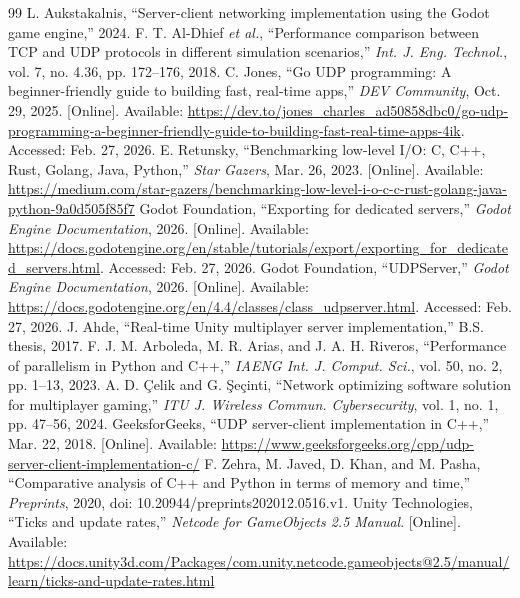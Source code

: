 \IfFileExists{IEEEtran.cls}{\ieeetrue\documentclass[conference]{IEEEtran}}{\ieeefalse\documentclass[twocolumn,10pt]{article}}
\begin{document}
\begin{thebibliography}{99}
 L. Aukstakalnis, ``Server-client networking implementation using the Godot game engine,'' 2024.
 F. T. Al-Dhief \emph{et al.}, ``Performance comparison between TCP and UDP protocols in different simulation scenarios,'' \emph{Int. J. Eng. Technol.}, vol. 7, no. 4.36, pp. 172--176, 2018.
 C. Jones, ``Go UDP programming: A beginner-friendly guide to building fast, real-time apps,'' \emph{DEV Community}, Oct. 29, 2025. [Online]. Available: \url{https://dev.to/jones_charles_ad50858dbc0/go-udp-programming-a-beginner-friendly-guide-to-building-fast-real-time-apps-4ik}. Accessed: Feb. 27, 2026.
 E. Retunsky, ``Benchmarking low-level I/O: C, C++, Rust, Golang, Java, Python,'' \emph{Star Gazers}, Mar. 26, 2023. [Online]. Available: \url{https://medium.com/star-gazers/benchmarking-low-level-i-o-c-c-rust-golang-java-python-9a0d505f85f7}
 Godot Foundation, ``Exporting for dedicated servers,'' \emph{Godot Engine Documentation}, 2026. [Online]. Available: \url{https://docs.godotengine.org/en/stable/tutorials/export/exporting_for_dedicated_servers.html}. Accessed: Feb. 27, 2026.
 Godot Foundation, ``UDPServer,'' \emph{Godot Engine Documentation}, 2026. [Online]. Available: \url{https://docs.godotengine.org/en/4.4/classes/class_udpserver.html}. Accessed: Feb. 27, 2026.
 J. Ahde, ``Real-time Unity multiplayer server implementation,'' B.S. thesis, 2017.
 F. J. M. Arboleda, M. R. Arias, and J. A. H. Riveros, ``Performance of parallelism in Python and C++,'' \emph{IAENG Int. J. Comput. Sci.}, vol. 50, no. 2, pp. 1--13, 2023.
 A. D. \c{C}elik and G. \c{S}e\c{c}inti, ``Network optimizing software solution for multiplayer gaming,'' \emph{ITU J. Wireless Commun. Cybersecurity}, vol. 1, no. 1, pp. 47--56, 2024.
 GeeksforGeeks, ``UDP server-client implementation in C++,'' Mar. 22, 2018. [Online]. Available: \url{https://www.geeksforgeeks.org/cpp/udp-server-client-implementation-c/}
 F. Zehra, M. Javed, D. Khan, and M. Pasha, ``Comparative analysis of C++ and Python in terms of memory and time,'' \emph{Preprints}, 2020, doi: 10.20944/preprints202012.0516.v1.
 Unity Technologies, ``Ticks and update rates,'' \emph{Netcode for GameObjects 2.5 Manual}. [Online]. Available: \url{https://docs.unity3d.com/Packages/com.unity.netcode.gameobjects@2.5/manual/learn/ticks-and-update-rates.html}

\end{thebibliography}
\end{document}
